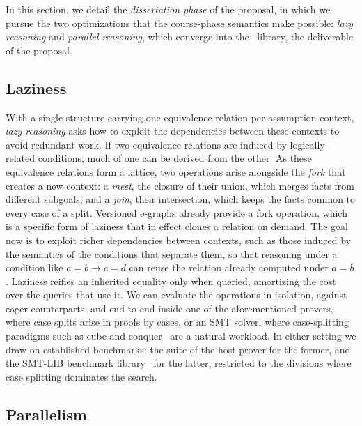 In this section, we detail the \textit{dissertation phase} of the proposal, in
which we pursue the two optimizations that the course-phase semantics make
possible: \textit{lazy reasoning} and \textit{parallel reasoning}, which
converge into the \system\ library, the deliverable of the proposal.

\subsection{Laziness}
\label{sec:lazy}

With a single structure carrying one equivalence relation per assumption
context, \textit{lazy reasoning} asks how to exploit the dependencies between
these contexts to avoid redundant work. If two equivalence relations are induced
by logically related conditions, much of one can be derived from the other.
As these equivalence relations form a lattice, two operations arise alongside the
\textit{fork} that creates a new
context: a \textit{meet}, the closure of their union, which merges facts from
different subgoals; and a \textit{join}, their intersection, which keeps the
facts common to every case of a split. Versioned e-graphs already provide a fork
operation, which is a specific form of laziness that in effect clones a relation
on demand. The goal now is to exploit richer dependencies between contexts,
such as those induced by the semantics of the conditions that separate them,
so that reasoning under a condition like $a = b \to c = d$ can reuse the relation
already computed under $a = b$. Laziness reifies an inherited equality only when
queried, amortizing the cost over the queries that use it. We can
evaluate the operations in isolation, against eager counterparts, and end to end
inside one of the aforementioned provers, where case splits arise in proofs
by cases, or an SMT solver, where case-splitting paradigms such as
cube-and-conquer~\cite{heule2011cube} are a natural workload. In either setting
we draw on established benchmarks: the suite of the host prover for the former,
and the SMT-LIB benchmark library~\cite{barrett2016smtlib} for the latter,
restricted to the divisions where case splitting dominates the search.

\subsection{Parallelism}

